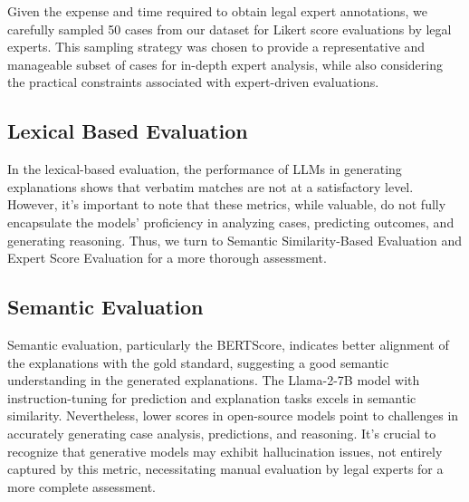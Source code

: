 Given the expense and time required to obtain legal expert annotations, we carefully sampled 50 cases from our dataset for Likert score evaluations by legal experts. This sampling strategy was chosen to provide a representative and manageable subset of cases for in-depth expert analysis, while also considering the practical constraints associated with expert-driven evaluations.

\subsection{Lexical Based Evaluation}
In the lexical-based evaluation, the performance of LLMs in generating explanations shows that verbatim matches are not at a satisfactory level. However, it's important to note that these metrics, while valuable, do not fully encapsulate the models' proficiency in analyzing cases, predicting outcomes, and generating reasoning. Thus, we turn to Semantic Similarity-Based Evaluation and Expert Score Evaluation for a more thorough assessment.

\subsection{Semantic Evaluation}
Semantic evaluation, particularly the BERTScore, indicates better alignment of the explanations with the gold standard, suggesting a good semantic understanding in the generated explanations. The Llama-2-7B model with instruction-tuning for prediction and explanation tasks excels in semantic similarity. Nevertheless, lower scores in open-source models point to challenges in accurately generating case analysis, predictions, and reasoning. It's crucial to recognize that generative models may exhibit hallucination issues, not entirely captured by this metric, necessitating manual evaluation by legal experts for a more complete assessment.


